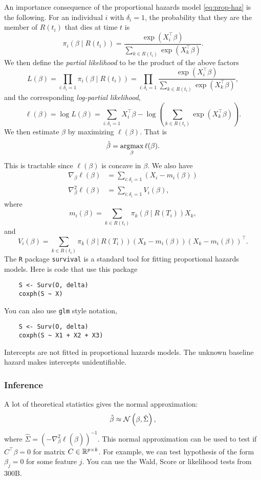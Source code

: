 An importance consequence of the proportional hazards model \eqref{eq:prop-haz} is the following. For an individual $i$ with $\delta_i=1$, the probability that they are the member of $R(t_i)$ that dies at time $t$ is 
\[\pi_i(\beta\mid R(t_i)) = \frac{\exp(X_i^\top \beta)}{\sum_{k \in R(t_i)} \exp(X_k^\top \beta)}. \]
We then define the \emph{partial likelihood} to be the product of the above factors 
\[L(\beta) = \prod_{i:\delta_i=1} \pi_i(\beta \mid R(t_i)) = \prod_{i:\delta_i = 1}\frac{\exp(X_i^\top \beta)}{\sum_{k \in R(t_i)} \exp(X_k^\top \beta)}, \]
and the corresponding \emph{log-partial likelihood},
\[\ell(\beta) = \log L(\beta) = \sum_{i:\delta_i = 1} X_i^\top \beta -\log \left(\sum_{k \in R(t_i)} \exp(X_k^\top \beta)\right). \]
We then estimate $\beta$ by maximizing $\ell(\beta)$. That is
\[\hat{\beta} = \operatorname*{argmax}_{\beta} \ell(\beta). \]
This is tractable since $\ell(\beta)$ is concave in $\beta$. We also have
\begin{align*}
    \nabla_\beta \ell(\beta) &=\sum_{i :\delta_i = 1}\left( X_i - m_i(\beta)\right)\\
    \nabla^2_\beta \ell(\beta) &=\sum_{i:\delta_i=1}V_i(\beta),
\end{align*}
where
\[m_i(\beta) = \sum_{k \in R(t_i)}\pi_k(\beta \mid R(T_i))X_k,\]
and
\[ V_i(\beta) = \sum_{k \in R(t_i)}\pi_k(\beta \mid R(T_i))(X_k - m_i(\beta))(X_k - m_i(\beta))^\top.\]
The \verb|R| package \verb|survival| is a standard tool for fitting proportional hazards models. Here is code that use this package
\begin{verbatim}
    S <- Surv(O, delta)
    coxph(S ~ X)
\end{verbatim}
You can also use \verb|glm| style notation,
\begin{verbatim}
    S <- Surv(O, delta)
    coxph(S ~ X1 + X2 + X3)
\end{verbatim}
Intercepts are not fitted in proportional hazards models. The unknown baseline hazard makes intercepts unidentifiable.


\subsubsection*{Inference}
A lot of theoretical statistics gives the normal approximation:
\[\hat{\beta} \approx {\mathcal N}\left(\beta, \hat{\Sigma}\right), \]
where $\hat{\Sigma} = \left(-\nabla^2_\beta \ell(\hat{\beta})\right)^{-1}$. This normal approximation can be used to test if $C^\top\beta = 0$ for matrix $C \in \mathbb{R}^{p \times k}$. For example, we can test hypothesis of the form $\beta_j=0$ for some feature $j$. You can use the Wald, Score or likelihood tests from 300B.


